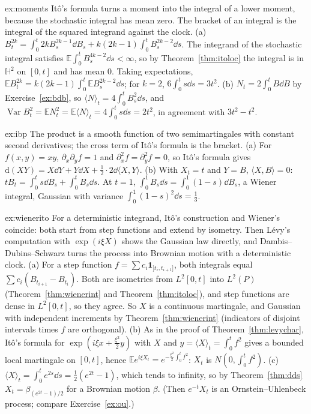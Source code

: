 \begin{solution}{ex:moments}
\idea It\^o's formula turns a moment into the integral of a lower moment, because the stochastic integral has mean zero. The bracket of an integral is the integral of the squared integrand against the clock.
\writeup (a) $B_t^{2k}=\int_0^t2kB_s^{2k-1}\dd B_s+k(2k-1)\int_0^tB_s^{2k-2}\dd s$. The integrand of the stochastic integral satisfies $\mathbb E\int_0^tB_s^{4k-2}\dd s<\infty$, so by Theorem~\ref{thm:itoloc} the integral is in $\mathbb H^2$ on
$[0,t]$ and has mean $0$. Taking expectations, $\mathbb EB_t^{2k}=k(2k-1)\int_0^t\mathbb EB_s^{2k-2}\dd s$; for $k=2$, $6\int_0^ts\dd s=3t^2$. (b) $N_t=2\int_0^tB\dd B$ by Exercise~\ref{ex:bdb}, so $\langle N\rangle_t=4\int_0^tB_s^2\dd s$, and
$\operatorname{Var}B_t^2=\mathbb EN_t^2=\mathbb E\langle N\rangle_t=4\int_0^ts\dd s=2t^2$, in agreement with $3t^2-t^2$.
\end{solution}

\begin{solution}{ex:ibp}
\idea The product is a smooth function of two semimartingales with constant second derivatives; the cross term of It\^o's formula is the bracket.
\writeup (a) For $f(x,y)=xy$, $\partial_x\partial_yf=1$ and $\partial_x^2f=\partial_y^2f=0$, so It\^o's formula gives $\mathrm d(XY)=X\dd Y+Y\dd X+\frac12\cdot2\dd\langle X,Y\rangle$. (b) With $X_t=t$ and $Y=B$, $\langle X,B\rangle=0$:
$tB_t=\int_0^ts\dd B_s+\int_0^tB_s\dd s$. At $t=1$, $\int_0^1B_s\dd s=\int_0^1(1-s)\dd B_s$, a Wiener integral, Gaussian with variance $\int_0^1(1-s)^2\dd s=\frac13$.
\end{solution}

\begin{solution}{ex:wienerito}
\idea For a deterministic integrand, It\^o's construction and Wiener's coincide: both start from step functions and extend by isometry. Then L\'evy's computation with $\exp(i\xi X)$ shows the Gaussian law directly, and
Dambis--Dubins--Schwarz turns the process into Brownian motion with a deterministic clock.
\writeup (a) For a step function $f=\sum c_i\mathbf 1_{]t_i,t_{i+1}]}$, both integrals equal $\sum c_i(B_{t_{i+1}}-B_{t_i})$. Both are isometries from $L^2[0,t]$ into $L^2(P)$ (Theorem~\ref{thm:wienerint} and
Theorem~\ref{thm:itoloc}), and step functions are dense in $L^2[0,t]$, so they agree. So $X$ is a continuous martingale, and Gaussian with independent increments by Theorem~\ref{thm:wienerint} (indicators of disjoint
intervals times $f$ are orthogonal). (b) As in the proof of Theorem~\ref{thm:levychar}, It\^o's formula for $\exp(i\xi x+\frac{\xi^2}2y)$ with $X$ and $y=\langle X\rangle_t=\int_0^tf^2$ gives a bounded local martingale on $[0,t]$, hence
$\mathbb Ee^{i\xi X_t}=e^{-\frac{\xi^2}2\int_0^tf^2}$: $X_t$ is $N(0,\int_0^tf^2)$. (c) $\langle X\rangle_t=\int_0^te^{2s}\dd s=\frac12(e^{2t}-1)$, which tends to infinity, so by Theorem~\ref{thm:dds} $X_t=\beta_{(e^{2t}-1)/2}$ for a Brownian
motion $\beta$. (Then $e^{-t}X_t$ is an Ornstein--Uhlenbeck process; compare Exercise~\ref{ex:ou}.)
\end{solution}

